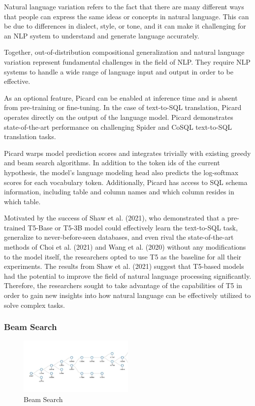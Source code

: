 Natural language variation refers to the fact that there are many different ways that people can express the same ideas or concepts in natural language. This can be due to differences in dialect, style, or tone, and it can make it challenging for an NLP system to understand and generate language accurately.

Together, out-of-distribution compositional generalization and natural language variation represent fundamental challenges in the field of NLP. They require NLP systems to handle a wide range of language input and output in order to be effective.

As an optional feature, Picard can be enabled at inference time and is absent from pre-training or fine-tuning. In the case of text-to-SQL translation, Picard operates directly on the output of the language model.
Picard demonstrates state-of-the-art performance on challenging Spider and CoSQL text-to-SQL translation tasks.

Picard warps model prediction scores and integrates trivially with existing greedy and beam search algorithms. In addition to the token ids of the current hypothesis, the model's language modeling head also predicts the log-softmax scores for each vocabulary token. Additionally, Picard has access to SQL schema information, including table and column names and which column resides in which table.

Motivated by the success of Shaw et al. (2021), who demonstrated that a pre-trained T5-Base or T5-3B model could effectively learn the text-to-SQL task, generalize to never-before-seen databases, and even rival the state-of-the-art methods of Choi et al. (2021) and Wang et al. (2020) without any modifications to the model itself, the researchers opted to use T5 as the baseline for all their experiments. The results from Shaw et al. (2021) suggest that T5-based models had the potential to improve the field of natural language processing significantly. Therefore, the researchers sought to take advantage of the capabilities of T5 in order to gain new insights into how natural language can be effectively utilized to solve complex tasks.

\subsubsection{Beam Search}

\begin{figure}[h]
    \centering
    \includegraphics[width=0.5\textwidth]{pics/picard/beam.png}
    \caption{Beam Search}
    \label{fig:beam_search}
\end{figure}

